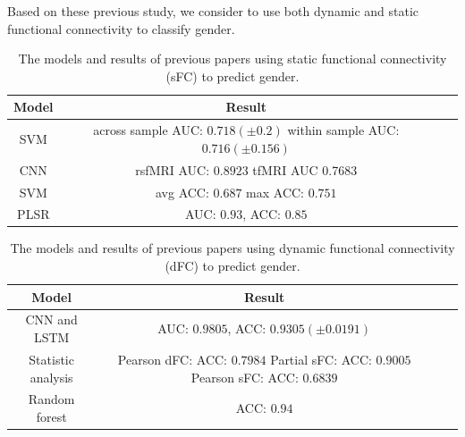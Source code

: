 \documentclass[11pt]{article}
\begin{document}
Based on these previous study, we consider to use both dynamic and static functional connectivity to classify gender.

\begin{table}[H]
    \centering
    \begin{tabular}{|c|c|c|c|}
        \hline
        Model & Result                                         \\
        \hline
        SVM   & \makecell{across sample AUC: $0.718 (\pm 0.2)$ \\  within sample AUC: $0.716 (\pm 0.156)$}       \\
        \hline
        CNN   & \makecell{rsfMRI AUC: $0.8923$                 \\ tfMRI AUC 0.7683}   \\
        \hline
        SVM   & \makecell{avg ACC: $0.687$                     \\ max ACC: $0.751$} \\
        \hline
        PLSR  & AUC: $0.93$, ACC: $0.85$
        \\
        \hline
    \end{tabular}
    \caption{The models and results of previous papers using static functional connectivity (sFC) to predict gender.}
    \label{intro-sfc-results}
\end{table}

\begin{table}[H]
    \centering
    \begin{tabular}{|c|c|c|c|}
        \hline
        Model         & Result                                    \\
        \hline
        CNN and LSTM  & AUC: $0.9805$, ACC: $0.9305 (\pm 0.0191)$
        \\
        \hline
        Statistic analysis
                      & \makecell{Pearson dFC: ACC: $0.7984$      \\
        Partial sFC: ACC: $0.9005$                                \\
            Pearson sFC: ACC: $0.6839$}
        \\
        \hline
        Random forest & ACC: $0.94$                               \\
        \hline
    \end{tabular}
    \caption{The models and results of previous papers using dynamic functional connectivity (dFC) to predict gender.}
    \label{intro-dfc-results}
\end{table}
\end{document}
